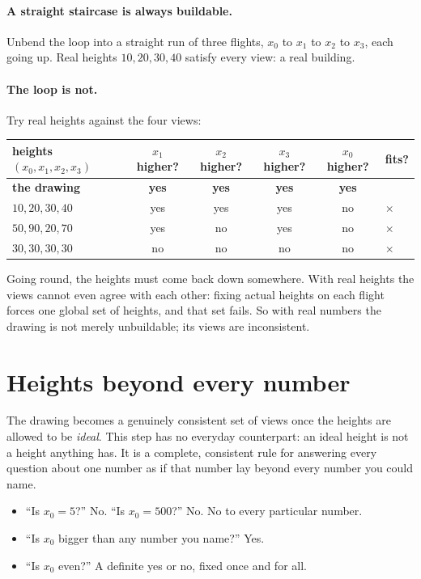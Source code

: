 \documentclass[11pt]{article}
\theoremstyle{plain}
\theoremstyle{definition}
\begin{document}
\paragraph{A straight staircase is always buildable.} Unbend the loop into a
straight run of three flights, $x_0$ to $x_1$ to $x_2$ to $x_3$, each going
up. Real heights $10,20,30,40$ satisfy every view: a real building.

\paragraph{The loop is not.} Try real heights against the four views:
\begin{center}\small
\begin{tabular}{l | c c c c | l}
heights $(x_0,x_1,x_2,x_3)$ & $x_1$ higher? & $x_2$ higher? & $x_3$ higher? & $x_0$ higher? & fits?\\\hline
\textbf{the drawing} & \textbf{yes} & \textbf{yes} & \textbf{yes} & \textbf{yes} & \\\hline
$10,20,30,40$ & yes & yes & yes & no & $\times$\\
$50,90,20,70$ & yes & no & yes & no & $\times$\\
$30,30,30,30$ & no & no & no & no & $\times$\\
\end{tabular}
\end{center}
Going round, the heights must come back down somewhere. With real heights the
views cannot even agree with each other: fixing actual heights on each flight
forces one global set of heights, and that set fails. So with real numbers the
drawing is not merely unbuildable; its views are inconsistent.

\section{Heights beyond every number}\label{sec:stair}

The drawing becomes a genuinely consistent set of views once the heights are
allowed to be \emph{ideal}. This step has no everyday counterpart: an ideal
height is not a height anything has. It is a complete, consistent rule for
answering every question about one number as if that number lay beyond every
number you could name.
\begin{itemize}[nosep]
  \item ``Is $x_0=5$?'' No. ``Is $x_0=500$?'' No. No to every particular number.
  \item ``Is $x_0$ bigger than any number you name?'' Yes.
  \item ``Is $x_0$ even?'' A definite yes or no, fixed once and for all.
\end{itemize}
\end{document}
